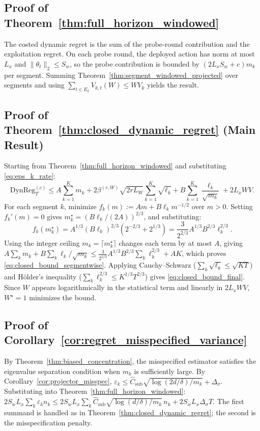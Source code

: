 \documentclass{article}
\newcommand{\DynReg}{\mathrm{DynReg}}
\begin{document}
\subsection{Proof of Theorem~\ref{thm:full_horizon_windowed}}

The costed dynamic regret is the sum of the probe-round contribution and the exploitation regret.
On each probe round, the deployed action has norm at most $L_x$ and $\|\theta_t\|_2\le S_w$, so the probe contribution is bounded by $(2L_xS_w+c)m_k$ per segment.
Summing Theorem~\ref{thm:segment_windowed_projected} over segments and using $\sum_{t\in E_k} V_{k,t}(W) \le W V_k$ yields the result.

\subsection{Proof of Theorem~\ref{thm:closed_dynamic_regret} (Main Result)}

Starting from Theorem~\ref{thm:full_horizon_windowed} and substituting \eqref{eq:eps_k_rate}:
\[
\DynReg_T^{(c)} \le A\sum_{k=1}^K m_k + 2\beta^{(r,W)}\sqrt{2rL_W}\sum_{k=1}^K \sqrt{\ell_k} + B\sum_{k=1}^K \frac{\ell_k}{\sqrt{m_k}} + 2L_xWV.
\]
For each segment $k$, minimize $f_k(m) := A m + B \ell_k m^{-1/2}$ over $m>0$.
Setting $f_k'(m) = 0$ gives $m_k^\star = (B\ell_k/(2A))^{2/3}$, and substituting:
\[
f_k(m_k^\star) = A^{1/3}(B\ell_k)^{2/3}(2^{-2/3}+2^{1/3}) = \frac{3}{2^{2/3}}A^{1/3}B^{2/3}\ell_k^{2/3}.
\]
Using the integer ceiling $m_k = \lceil m_k^\star \rceil$ changes each term by at most $A$, giving
$A\sum_k m_k + B\sum_k \ell_k/\sqrt{m_k} \le \frac{3}{2^{2/3}} A^{1/3} B^{2/3} \sum_k \ell_k^{2/3} + AK$,
which proves \eqref{eq:closed_bound_segmentwise}.
Applying Cauchy--Schwarz ($\sum_k\sqrt{\ell_k} \le \sqrt{KT}$) and H\"older's inequality ($\sum_k \ell_k^{2/3} \le K^{1/3}T^{2/3}$) gives \eqref{eq:closed_bound_final}.
Since $W$ appears logarithmically in the statistical term and linearly in $2L_xWV$, $W^\star=1$ minimizes the bound.

\subsection{Proof of Corollary~\ref{cor:regret_misspecified_variance}}

By Theorem~\ref{thm:biased_concentration}, the misspecified estimator satisfies the eigenvalue separation condition when $m_k$ is sufficiently large.
By Corollary~\ref{cor:projector_misspec}, $\varepsilon_k \le \hat C_{\mathrm{sub}}\sqrt{\log(2d/\delta)/m_k} + \Delta_\sigma$.
Substituting into Theorem~\ref{thm:full_horizon_windowed}:
$2S_wL_x\sum_k\varepsilon_k n_k \le 2S_wL_x\sum_k\hat C_{\mathrm{sub}}\sqrt{\log(d/\delta)/m_k}\,n_k + 2S_wL_x\Delta_\sigma T$.
The first summand is handled as in Theorem~\ref{thm:closed_dynamic_regret}; the second is the misspecification penalty.
\end{document}

